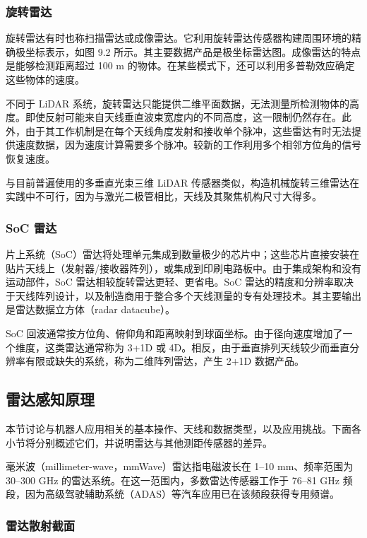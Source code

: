 \subsubsection{旋转雷达}

旋转雷达有时也称扫描雷达或成像雷达。它利用旋转雷达传感器构建周围环境的精确极坐标表示，如图 9.2 所示。其主要数据产品是极坐标雷达图。成像雷达的特点是能够检测距离超过 100 m 的物体。在某些模式下，还可以利用多普勒效应确定这些物体的速度。

不同于 LiDAR 系统，旋转雷达只能提供二维平面数据，无法测量所检测物体的高度。即使反射可能来自天线垂直波束宽度内的不同高度，这一限制仍然存在。此外，由于其工作机制是在每个天线角度发射和接收单个脉冲，这些雷达有时无法提供速度数据，因为速度计算需要多个脉冲。较新的工作利用多个相邻方位角的信号恢复速度。

与目前普遍使用的多垂直光束三维 LiDAR 传感器类似，构造机械旋转三维雷达在实践中不可行，因为与激光二极管相比，天线及其聚焦机构尺寸大得多。

\subsubsection{SoC 雷达}

片上系统（SoC）雷达将处理单元集成到数量极少的芯片中；这些芯片直接安装在贴片天线上（发射器/接收器阵列），或集成到印刷电路板中。由于集成架构和没有运动部件，SoC 雷达相较旋转雷达更轻、更省电。SoC 雷达的精度和分辨率取决于天线阵列设计，以及制造商用于整合多个天线测量的专有处理技术。其主要输出是雷达数据立方体（radar datacube）。

SoC 回波通常按方位角、俯仰角和距离映射到球面坐标。由于径向速度增加了一个维度，这类雷达通常称为 3+1D 或 4D。相反，由于垂直排列天线较少而垂直分辨率有限或缺失的系统，称为二维阵列雷达，产生 2+1D 数据产品。

\subsection{雷达感知原理}

本节讨论与机器人应用相关的基本操作、天线和数据类型，以及应用挑战。下面各小节将分别概述它们，并说明雷达与其他测距传感器的差异。

毫米波（millimeter-wave，mmWave）雷达指电磁波长在 1--10 mm、频率范围为 30--300 GHz 的雷达系统。在这一范围内，多数雷达传感器工作于 76--81 GHz 频段，因为高级驾驶辅助系统（ADAS）等汽车应用已在该频段获得专用频谱。

\subsubsection{雷达散射截面}

